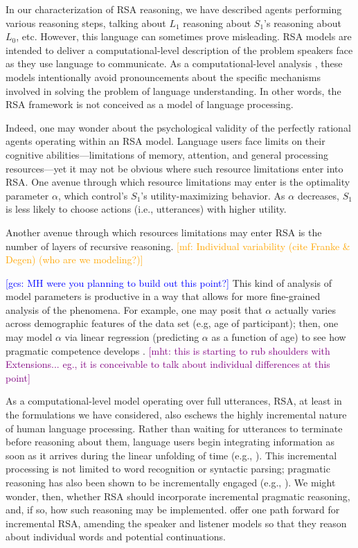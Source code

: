 \documentclass{sp}
\newcommand{\gcs}[1]{\textcolor{blue}{[gcs: #1]}}
\newcommand{\mf}[1]{\textcolor{orange}{[mf: #1]}}
\newcommand{\mht}[1]{\textcolor{purple}{[mht: #1]}}
\begin{document}
In our characterization of RSA reasoning, we have described agents performing various reasoning steps, talking about $L_1$ reasoning about $S_1$'s reasoning about $L_0$, etc. However, this language can sometimes prove misleading. RSA models are intended to deliver a computational-level description of the problem speakers face as they use language to communicate. As a computational-level analysis \citep{marr1982}, these models intentionally avoid pronouncements about the specific mechanisms involved in solving the problem of language understanding. In other words, the RSA framework is not conceived as a model of language processing.

Indeed, one may wonder about the psychological validity of the perfectly rational agents operating within an RSA model. Language users face limits on their cognitive abilities---limitations of memory, attention, and general processing resources---yet it may not be obvious where such resource limitations enter into RSA. One avenue through which resource limitations may enter is the optimality parameter $\alpha$, which control's $S_1$'s utility-maximizing behavior. As $\alpha$ decreases, $S_1$ is less likely to choose actions (i.e., utterances) with higher utility.

Another avenue through which resources limitations may enter RSA is the number of layers of recursive reasoning.
\mf{Individual variability (cite Franke \& Degen) (who are we modeling?)}

\gcs{MH were you planning to build out this point?} This kind of analysis of model parameters is productive in a way that allows for more fine-grained analysis of the phenomena. For example, one may posit that $\alpha$ actually varies across demographic features of the data set (e.g, age of participant); then, one may model $\alpha$ via linear regression (predicting $\alpha$ as a function of age) to see how pragmatic competence develops \citep{bohn2019predicting}.
\mht{this is starting to rub shoulders with Extensions... eg., it is conceivable to talk about individual differences at this point}

As a computational-level model operating over full utterances, RSA, at least in the formulations we have considered, also eschews the highly incremental nature of human language processing. Rather than waiting for utterances to terminate before reasoning about them, language users begin integrating information as soon as it arrives during the linear unfolding of time (e.g., \citealp{tanenhausetal1995}). This incremental processing is not limited to word recognition or syntactic parsing; pragmatic reasoning has also been shown to be incrementally engaged (e.g., \citealp{sedivyetal1999,sedivy2007}). We might wonder, then, whether RSA should incorporate incremental pragmatic reasoning, and, if so, how such reasoning may be implemented. \cite{cohngordgonetal2019} offer one path forward for incremental RSA, amending the speaker and listener models so that they reason about individual words and potential continuations.
\end{document}
